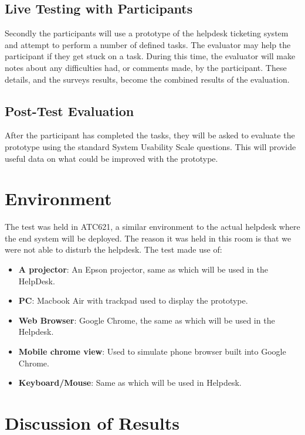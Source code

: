 \documentclass[12pt,a4paper,]{article}
\providecommand{\tightlist}{%
  \setlength{\itemsep}{0pt}\setlength{\parskip}{0pt}}
\begin{document}
\subsection{Live Testing with
Participants}\label{live-testing-with-participants}

Secondly the participants will use a prototype of the helpdesk ticketing
system and attempt to perform a number of defined tasks. The evaluator
may help the participant if they get stuck on a task. During this time,
the evaluator will make notes about any difficulties had, or comments
made, by the participant. These details, and the surveys results, become
the combined results of the evaluation.

\subsection{Post-Test Evaluation}\label{post-test-evaluation}

After the participant has completed the tasks, they will be asked to
evaluate the prototype using the standard System Usability Scale
questions. This will provide useful data on what could be improved with
the prototype.

\section{Environment}\label{environment}

The test was held in ATC621, a similar environment to the actual
helpdesk where the end system will be deployed. The reason it was held
in this room is that we were not able to disturb the helpdesk. The test
made use of:

\begin{itemize}
\tightlist
\item
  \textbf{A projector}: An Epson projector, same as which will be used
  in the HelpDesk.
\item
  \textbf{PC}: Macbook Air with trackpad used to display the prototype.
\item
  \textbf{Web Browser}: Google Chrome, the same as which will be used in
  the Helpdesk.
\item
  \textbf{Mobile chrome view}: Used to simulate phone browser built into
  Google Chrome.
\item
  \textbf{Keyboard/Mouse}: Same as which will be used in Helpdesk.
\end{itemize}

\section{Discussion of Results}\label{discussion-of-results}
\end{document}

